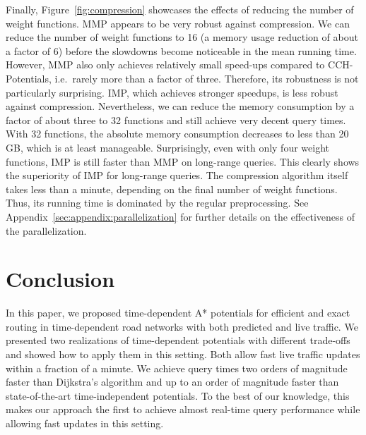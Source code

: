 \documentclass[a4paper,UKenglish,cleveref, autoref, thm-restate,anonymous]{lipics-v2021}
\begin{document}
Finally, Figure~\ref{fig:compression} showcases the effects of reducing the number of weight functions.
MMP appears to be very robust against compression.
We can reduce the number of weight functions to 16 (a memory usage reduction of about a factor of 6) before the slowdowns become noticeable in the mean running time.
However, MMP also only achieves relatively small speed-ups compared to CCH-Potentials, i.e.\ rarely more than a factor of three.
Therefore, its robustness is not particularly surprising.
IMP, which achieves stronger speedups, is less robust against compression.
Nevertheless, we can reduce the memory consumption by a factor of about three to 32 functions and still achieve very decent query times.
With 32 functions, the absolute memory consumption decreases to less than 20\,GB, which is at least manageable.
Surprisingly, even with only four weight functions, IMP is still faster than MMP on long-range queries.
This clearly shows the superiority of IMP for long-range queries.
The compression algorithm itself takes less than a minute, depending on the final number of weight functions.
Thus, its running time is dominated by the regular preprocessing.
See Appendix~\ref{sec:appendix:parallelization} for further details on the effectiveness of the parallelization.

\section{Conclusion}

In this paper, we proposed time-dependent A* potentials for efficient and exact routing in time-dependent road networks with both predicted and live traffic.
We presented two realizations of time-dependent potentials with different trade-offs and showed how to apply them in this setting.
Both allow fast live traffic updates within a fraction of a minute.
We achieve query times two orders of magnitude faster than Dijkstra's algorithm and up to an order of magnitude faster than state-of-the-art time-independent potentials.
To the best of our knowledge, this makes our approach the first to achieve almost real-time query performance while allowing fast updates in this setting.

\end{document}

